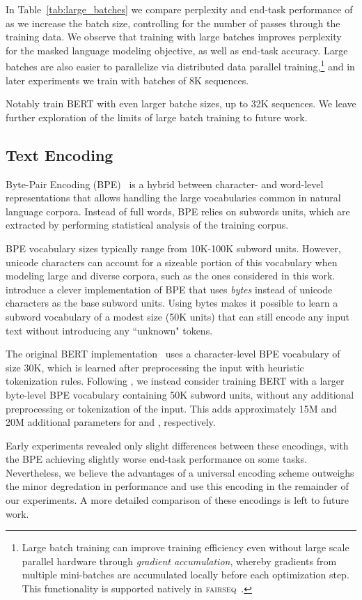 

In Table~\ref{tab:large_batches} we compare perplexity and end-task performance of \bertbase{} as we increase the batch size, controlling for the number of passes through the training data.
We observe that training with large batches improves perplexity for the masked language modeling objective, as well as end-task accuracy.
Large batches are also easier to parallelize via distributed data parallel training,\footnote{Large batch training can improve training efficiency even without large scale parallel hardware through \emph{gradient accumulation}, whereby gradients from multiple mini-batches are accumulated locally before each optimization step. This functionality is supported natively in \textsc{fairseq}~\cite{ott2019fairseq}.} and in later experiments we train with batches of 8K sequences.

Notably  train BERT with even larger batche sizes, up to 32K sequences.
We leave further exploration of the limits of large batch training to future work.




\subsection{Text Encoding}
\label{sec:bpe}

Byte-Pair Encoding (BPE)~\cite{sennrich2016neural} is a hybrid between character- and word-level representations that allows handling the large vocabularies common in natural language corpora.
Instead of full words, BPE relies on subwords units, which are extracted by performing statistical analysis of the training corpus.

BPE vocabulary sizes typically range from 10K-100K subword units. However, unicode characters can account for a sizeable portion of this vocabulary when modeling large and diverse corpora, such as the ones considered in this work.
 introduce a clever implementation of BPE that uses \emph{bytes} instead of unicode characters as the base subword units.
Using bytes makes it possible to learn a subword vocabulary of a modest size (50K units) that can still encode any input text without introducing any ``unknown" tokens.

The original BERT implementation~\cite{devlin2018bert} uses a character-level BPE vocabulary of size 30K, which is learned after preprocessing the input with heuristic tokenization rules.
Following , we instead consider training BERT with a larger byte-level BPE vocabulary containing 50K subword units, without any additional preprocessing or tokenization of the input.
This adds approximately 15M and 20M additional parameters for \bertbase{} and \bertlarge{}, respectively.

Early experiments revealed only slight differences between these encodings, with the  BPE achieving slightly worse end-task performance on some tasks.
Nevertheless, we believe the advantages of a universal encoding scheme outweighs the minor degredation in performance and use this encoding in the remainder of our experiments.
A more detailed comparison of these encodings is left to future work.